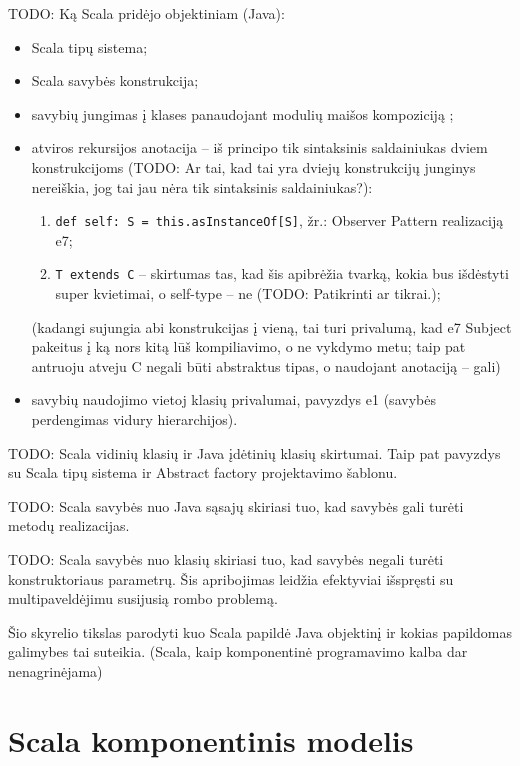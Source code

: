 TODO: Ką Scala pridėjo objektiniam (Java):
\begin{itemize}
  \item Scala tipų sistema;
  \item Scala savybės  konstrukcija;
  \item savybių jungimas į klases panaudojant modulių maišos
    kompoziciją ;
  \item atviros rekursijos anotacija  –
    iš principo tik sintaksinis saldainiukas dviem konstrukcijoms
    (TODO: Ar tai, kad tai yra dviejų konstrukcijų junginys nereiškia,
    jog tai jau nėra tik sintaksinis saldainiukas?):
    \begin{enumerate}
      \item \verb|def self: S = this.asInstanceOf[S]|, žr.: Observer
        Pattern realizaciją e7;
      \item \verb|T extends C| – skirtumas tas, kad šis apibrėžia
        tvarką, kokia bus išdėstyti super kvietimai, o self-type
        – ne (TODO: Patikrinti ar tikrai.);
    \end{enumerate}
    (kadangi sujungia abi konstrukcijas į vieną, tai turi privalumą, kad
    e7 Subject pakeitus į ką nors kitą lūš kompiliavimo, o ne vykdymo
    metu; taip pat antruoju atveju C negali būti abstraktus tipas, o
    naudojant anotaciją – gali)
  \item savybių naudojimo vietoj klasių privalumai, pavyzdys e1
    (savybės perdengimas vidury hierarchijos).
\end{itemize}

TODO: Scala vidinių klasių ir Java įdėtinių klasių skirtumai. Taip pat
pavyzdys su Scala tipų sistema ir Abstract factory projektavimo šablonu.

TODO: Scala savybės nuo Java sąsajų skiriasi tuo, kad savybės gali turėti
metodų realizacijas.

TODO: Scala savybės nuo klasių skiriasi tuo, kad savybės negali turėti
konstruktoriaus parametrų. Šis apribojimas leidžia efektyviai
išspręsti su multipaveldėjimu susijusią rombo problemą.

Šio skyrelio tikslas parodyti kuo Scala papildė Java objektinį ir
kokias papildomas galimybes tai suteikia. (Scala, kaip komponentinė
programavimo kalba dar nenagrinėjama)

\section{Scala komponentinis modelis}

